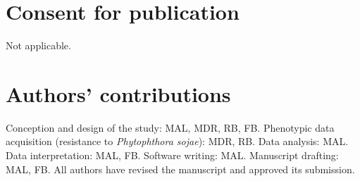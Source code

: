 \documentclass[doublespacing]{bmcart}
\begin{document}
\begin{backmatter}
\section*{Consent for publication}%
Not applicable.

\section*{Authors' contributions}
Conception and design of the study: MAL, MDR, RB, FB.
Phenotypic data acquisition (resistance to \textit{Phytophthora sojae}): MDR, RB.
Data analysis: MAL.
Data interpretation: MAL, FB.
Software writing: MAL.
Manuscript drafting: MAL, FB.
All authors have revised the manuscript and approved its submission.






\end{backmatter}
\end{document}
